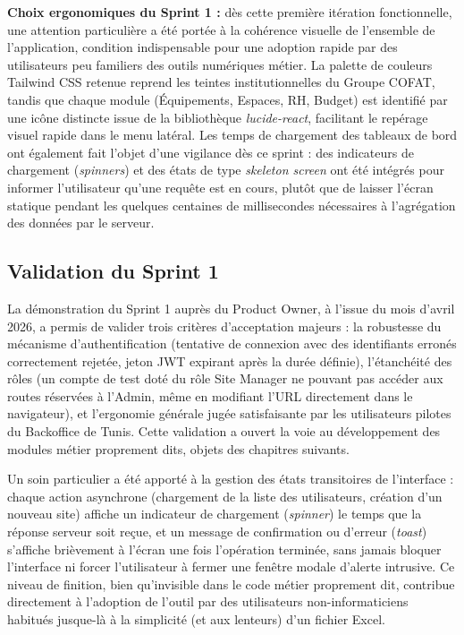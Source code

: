 \textbf{Choix ergonomiques du Sprint 1 :} dès cette première itération fonctionnelle, une attention particulière a été portée à la cohérence visuelle de l'ensemble de l'application, condition indispensable pour une adoption rapide par des utilisateurs peu familiers des outils numériques métier. La palette de couleurs Tailwind CSS retenue reprend les teintes institutionnelles du Groupe COFAT, tandis que chaque module (Équipements, Espaces, RH, Budget) est identifié par une icône distincte issue de la bibliothèque \textit{lucide-react}, facilitant le repérage visuel rapide dans le menu latéral. Les temps de chargement des tableaux de bord ont également fait l'objet d'une vigilance dès ce sprint : des indicateurs de chargement (\textit{spinners}) et des états de type \textit{skeleton screen} ont été intégrés pour informer l'utilisateur qu'une requête est en cours, plutôt que de laisser l'écran statique pendant les quelques centaines de millisecondes nécessaires à l'agrégation des données par le serveur.

\subsection{Validation du Sprint 1}
La démonstration du Sprint 1 auprès du Product Owner, à l'issue du mois d'avril 2026, a permis de valider trois critères d'acceptation majeurs : la robustesse du mécanisme d'authentification (tentative de connexion avec des identifiants erronés correctement rejetée, jeton JWT expirant après la durée définie), l'étanchéité des rôles (un compte de test doté du rôle Site Manager ne pouvant pas accéder aux routes réservées à l'Admin, même en modifiant l'URL directement dans le navigateur), et l'ergonomie générale jugée satisfaisante par les utilisateurs pilotes du Backoffice de Tunis. Cette validation a ouvert la voie au développement des modules métier proprement dits, objets des chapitres suivants.


Un soin particulier a été apporté à la gestion des états transitoires de l'interface : chaque action asynchrone (chargement de la liste des utilisateurs, création d'un nouveau site) affiche un indicateur de chargement (\textit{spinner}) le temps que la réponse serveur soit reçue, et un message de confirmation ou d'erreur (\textit{toast}) s'affiche brièvement à l'écran une fois l'opération terminée, sans jamais bloquer l'interface ni forcer l'utilisateur à fermer une fenêtre modale d'alerte intrusive. Ce niveau de finition, bien qu'invisible dans le code métier proprement dit, contribue directement à l'adoption de l'outil par des utilisateurs non-informaticiens habitués jusque-là à la simplicité (et aux lenteurs) d'un fichier Excel.

